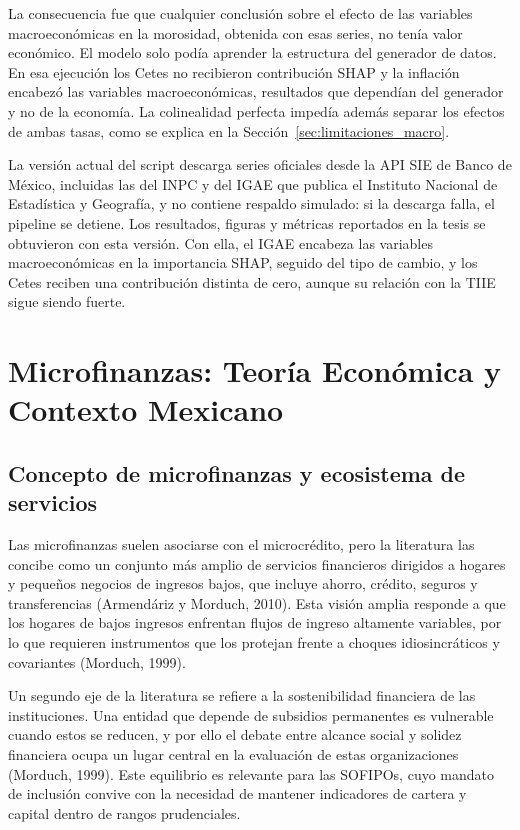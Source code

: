 La consecuencia fue que cualquier conclusión sobre el efecto de las variables macroeconómicas en la morosidad, obtenida con esas series, no tenía valor económico. El modelo solo podía aprender la estructura del generador de datos. En esa ejecución los Cetes no recibieron contribución SHAP y la inflación encabezó las variables macroeconómicas, resultados que dependían del generador y no de la economía. La colinealidad perfecta impedía además separar los efectos de ambas tasas, como se explica en la Sección~\ref{sec:limitaciones_macro}.

La versión actual del script descarga series oficiales desde la API SIE de Banco de México, incluidas las del INPC y del IGAE que publica el Instituto Nacional de Estadística y Geografía, y no contiene respaldo simulado: si la descarga falla, el pipeline se detiene. Los resultados, figuras y métricas reportados en la tesis se obtuvieron con esta versión. Con ella, el IGAE encabeza las variables macroeconómicas en la importancia SHAP, seguido del tipo de cambio, y los Cetes reciben una contribución distinta de cero, aunque su relación con la TIIE sigue siendo fuerte.

\section{Microfinanzas: Teoría Económica y Contexto Mexicano}

\subsection{Concepto de microfinanzas y ecosistema de servicios}
Las microfinanzas suelen asociarse con el microcrédito, pero la literatura las concibe como un conjunto más amplio de servicios financieros dirigidos a hogares y pequeños negocios de ingresos bajos, que incluye ahorro, crédito, seguros y transferencias (Armendáriz y Morduch, 2010). Esta visión amplia responde a que los hogares de bajos ingresos enfrentan flujos de ingreso altamente variables, por lo que requieren instrumentos que los protejan frente a choques idiosincráticos y covariantes (Morduch, 1999).

Un segundo eje de la literatura se refiere a la sostenibilidad financiera de las instituciones. Una entidad que depende de subsidios permanentes es vulnerable cuando estos se reducen, y por ello el debate entre alcance social y solidez financiera ocupa un lugar central en la evaluación de estas organizaciones (Morduch, 1999). Este equilibrio es relevante para las SOFIPOs, cuyo mandato de inclusión convive con la necesidad de mantener indicadores de cartera y capital dentro de rangos prudenciales.%

